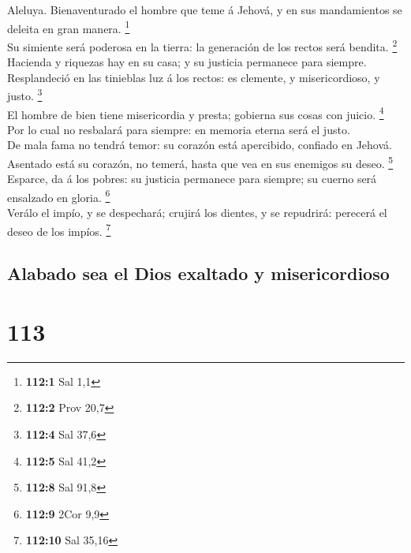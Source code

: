  Aleluya. Bienaventurado el hombre que teme á Jehová, y en
sus mandamientos se deleita en gran manera. \footnote{\textbf{112:1} Sal
  1,1}\\
 Su simiente será poderosa en la tierra: la generación de
los rectos será bendita. \footnote{\textbf{112:2} Prov 20,7}\\
 Hacienda y riquezas hay en su casa; y su justicia permanece
para siempre.\\
 Resplandeció en las tinieblas luz á los rectos: es
clemente, y misericordioso, y justo. \footnote{\textbf{112:4} Sal 37,6}\\
 El hombre de bien tiene misericordia y presta; gobierna sus
cosas con juicio. \footnote{\textbf{112:5} Sal 41,2}\\
 Por lo cual no resbalará para siempre: en memoria eterna
será el justo.\\
 De mala fama no tendrá temor: su corazón está apercibido,
confiado en Jehová.\\
 Asentado está su corazón, no temerá, hasta que vea en sus
enemigos su deseo. \footnote{\textbf{112:8} Sal 91,8}\\
 Esparce, da á los pobres: su justicia permanece para
siempre; su cuerno será ensalzado en gloria. \footnote{\textbf{112:9}
  2Cor 9,9}\\
 Verálo el impío, y se despechará; crujirá los dientes, y
se repudrirá: perecerá el deseo de los impíos. \footnote{\textbf{112:10}
  Sal 35,16}

\hypertarget{alabado-sea-el-dios-exaltado-y-misericordioso}{%
\subsection{Alabado sea el Dios exaltado y
misericordioso}\label{alabado-sea-el-dios-exaltado-y-misericordioso}}

\hypertarget{section-112}{%
\section{113}\label{section-112}}

